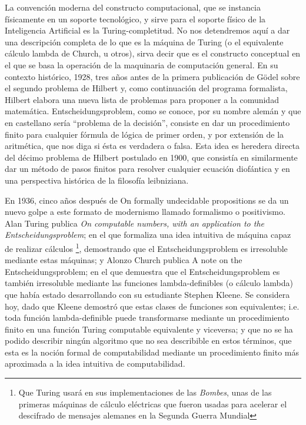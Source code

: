 \documentclass[12pt]{memoir}
\begin{document}
La convención moderna del constructo computacional, que se instancia físicamente en un soporte tecnológico, y sirve para el soporte físico de la Inteligencia Artificial es la Turing-completitud. No nos detendremos aquí a dar una descripción completa de lo que es la máquina de Turing (o el equivalente cálculo lambda de Church, u otros), sirva decir que es el constructo conceptual en el que se basa la operación de la maquinaria de computación general. En su contexto histórico, 1928, tres años antes de la primera publicación de Gödel sobre el segundo problema de Hilbert y, como continuación del programa formalista, Hilbert elabora una nueva lista de problemas para proponer a la comunidad matemática. Entscheidungsproblem, como se conoce, por su nombre alemán y que en castellano sería ``problema de la decisión'', consiste en dar un procedimiento finito para cualquier fórmula de lógica de primer orden, y por extensión de la aritmética, que nos diga si ésta es verdadera o falsa. Esta idea es heredera directa del décimo problema de Hilbert postulado en 1900, que consistía en similarmente dar un método de pasos finitos para resolver cualquier ecuación diofántica y en una perspectiva histórica de la filosofía leibniziana.

En 1936, cinco años después de On formally undecidable propositions se da un nuevo golpe a este formato de modernismo llamado formalismo o positivismo. Alan Turing publica \textit{On computable numbers, with an application to the Entscheidungsproblem}; en el que formaliza una idea intuitiva de máquina capaz de realizar cálculos \footnote{Que Turing usará en sus implementaciones de las \textit{Bombes}, unas de las primeras máquinas de cálculo eléctricas que fueron usadas para acelerar el descifrado de mensajes alemanes en la Segunda Guerra Mundial}, demostrando que el Entscheidungsproblem es irresoluble mediante estas máquinas; y Alonzo Church publica A note on the Entscheidungsproblem; en el que demuestra que el Entscheidungsproblem es también irresoluble mediante las funciones lambda-definibles (o cálculo lambda) que había estado desarrollando con su estudiante Stephen Kleene. Se considera hoy, dado que Kleene demostró que estas clases de funciones son equivalentes; i.e. toda función lambda-definible puede transformarse mediante un procedimiento finito en una función Turing computable equivalente y viceversa; y que no se ha podido describir ningún algoritmo que no sea describible en estos términos, que esta es la noción formal de computabilidad mediante un procedimiento finito más aproximada a la idea intuitiva de computabilidad.
\end{document}
